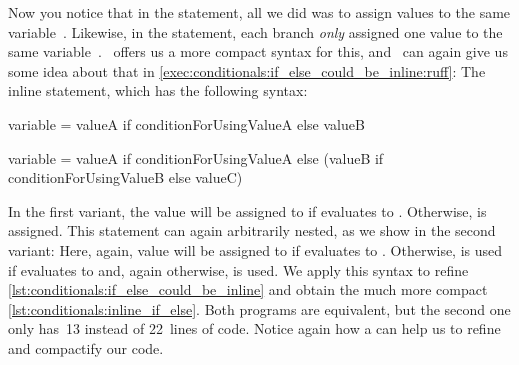 Now you notice that in the  statement, all we did was to assign values to the same variable~.
Likewise, in the  statement, each branch \emph{only} assigned one value to the same variable~.
\python\ offers us a more compact syntax for this, and \ruff\ can again give us some idea about that in \cref{exec:conditionals:if_else_could_be_inline:ruff}:
The inline  statement, which has the following syntax:%
%
\begin{pythonSyntax}[false]
variable = valueA if conditionForUsingValueA else valueB

variable = valueA if conditionForUsingValueA else (valueB if conditionForUsingValueB else valueC)
\end{pythonSyntax}
%
In the first variant, the value  will be assigned to  if  evaluates to .
Otherwise,  is assigned.
This statement can again arbitrarily nested, as we show in the second variant:
Here, again, value  will be assigned to  if  evaluates to .
Otherwise,  is used if  evaluates to  and, again otherwise,  is used.%
%
%
%
We apply this syntax to refine \cref{lst:conditionals:if_else_could_be_inline} and obtain the much more compact \cref{lst:conditionals:inline_if_else}.
Both programs are equivalent, but the second one only has~13 instead of 22~lines of code.
Notice again how a  can help us to refine and compactify our code.%
%
\FloatBarrier%
\endhsection%
\endhsection%
%

